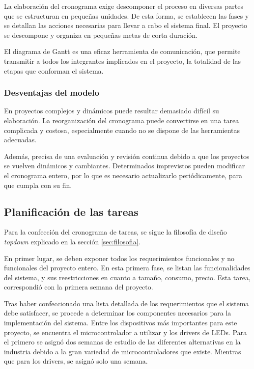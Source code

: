 La elaboración del cronograma exige descomponer el proceso en diversas partes que se estructuran en pequeñas unidades. De esta forma, se establecen las fases y se detallan las acciones necesarias para llevar a cabo el sistema final. El proyecto se descompone y organiza en pequeñas metas de corta duración.

El diagrama de Gantt es una eficaz herramienta de comunicación, que permite transmitir a todos los integrantes implicados en el proyecto, la totalidad de las etapas que conforman el sistema.

\subsubsection{Desventajas del modelo}
En proyectos  complejos y dinámicos puede resultar demasiado difícil su elaboración. La reorganización del cronograma puede convertirse en una tarea complicada y costosa, especialmente cuando no se dispone de las herramientas adecuadas.

Además, precisa de una evaluación y revisión continua debido a que los proyectos se vuelven dinámicos y cambiantes. Determinados imprevistos pueden modificar el cronograma entero, por lo que es necesario actualizarlo periódicamente, para que cumpla con su fin.

\subsection{Planificación de las tareas}

Para la confección del cronograma de tareas, se sigue la filosofía de diseño \emph{topdown} explicado en la sección \ref{sec:filosofia}.

En primer lugar, se deben exponer todos los requerimientos funcionales y no funcionales del proyecto entero.
En esta primera fase, se listan las funcionalidades del sistema, y sus reestricciones en cuanto a tamaño, consumo, precio.
Esta tarea, correspondió con la primera semana del proyecto.

Tras haber confeccionado una lista detallada de los requerimientos que el sistema debe satisfacer, se procede a determinar los componentes necesarios para la implementación del sistema.
Entre los dispositivos más importantes para este proyecto, se encuentra el microcontrolador a utilizar y los drivers de LEDs.
Para el primero se asignó dos semanas de estudio de las diferentes alternativas en la industria debido a la gran variedad de microcontroladores que existe. Mientras que para los drivers, se asignó solo una semana.

